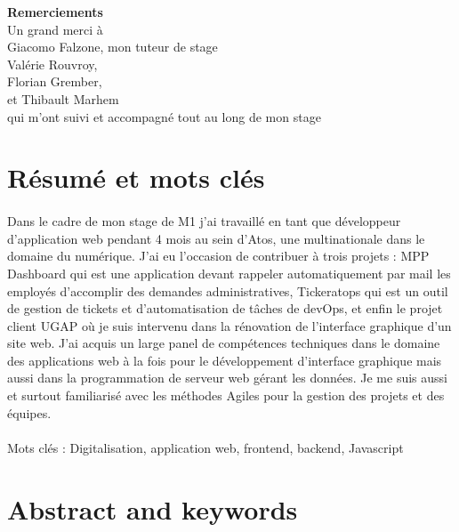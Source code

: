 \documentclass[12pt]{article}
\begin{document}
\begin {sloppypar}
\newpage 

\begin{center}
  \LARGE
  \textbf{Remerciements}
  \vspace{5cm}\\
  \normalsize
  Un grand merci à\\ 
  Giacomo Falzone, mon tuteur de stage\\
  Valérie Rouvroy, \\
  Florian Grember, \\
  et Thibault Marhem \\
  qui m'ont suivi et accompagné tout au long de mon stage
\end{center}
\newpage

\def\contentsname{Sommaires}
\tableofcontents
\newpage

\renewcommand{\listfigurename}{Table des matières des illustrations}
\listoffigures
\newpage

\section*{Résumé et mots clés}
\paragraph{}
Dans le cadre de mon stage de M1 j'ai travaillé en tant que développeur d'application 
web pendant 4 mois au sein d'Atos, une multinationale dans le domaine du numérique. 
J'ai eu l'occasion de contribuer à trois projets : MPP Dashboard qui est une application 
devant rappeler automatiquement par mail les employés d'accomplir des demandes administratives, 
Tickeratops qui est un outil de gestion de tickets et d'automatisation de tâches de devOps, et enfin 
le projet client UGAP où je suis intervenu dans la rénovation de l'interface graphique d'un site web. 
J'ai acquis un large panel de compétences techniques dans le domaine des applications web à la fois 
pour le développement d'interface graphique mais aussi dans la programmation de serveur web gérant les données.
Je me suis aussi et surtout familiarisé avec les méthodes Agiles pour la gestion des projets et des équipes.
\paragraph{}
Mots clés : Digitalisation, application web, frontend, backend, Javascript
\newpage

\section*{Abstract and keywords}

\end{sloppypar}
\end{document}

